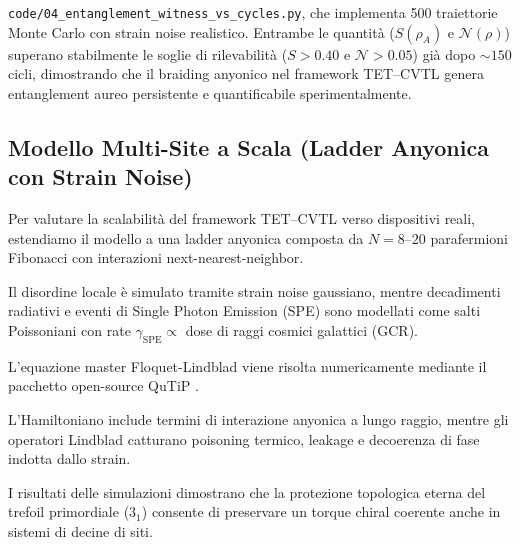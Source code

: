 \documentclass[11pt,a4paper]{article}
\let\oldcite\cite
\renewcommand{\cite}{\protect\oldcite}
\theoremstyle{plain}
\theoremstyle{definition}
\begin{document}
\texttt{code/04\_entanglement\_witness\_vs\_cycles.py}, che implementa 500 traiettorie Monte Carlo con strain noise realistico. 
Entrambe le quantità ($S(\rho_A)$ e $\mathcal{N}(\rho)$) superano stabilmente le soglie di rilevabilità ($S > 0.40$ e $\mathcal{N} > 0.05$) già dopo $\sim150$ cicli, dimostrando che il braiding anyonico nel framework TET--CVTL genera entanglement aureo persistente e quantificabile sperimentalmente. 





\vspace{0.5cm}


\subsection{Modello Multi-Site a Scala (Ladder Anyonica con Strain Noise)}


\vspace{0.2cm}

Per valutare la scalabilità del framework TET--CVTL verso dispositivi reali, estendiamo il modello a una ladder anyonica composta da $N = 8$–$20$ parafermioni Fibonacci con interazioni next-nearest-neighbor. 

\vspace{0.3cm}

Il disordine locale è simulato tramite strain noise gaussiano, mentre decadimenti radiativi e eventi di Single Photon Emission (SPE) sono modellati come salti Poissoniani con rate $\gamma_{\text{SPE}} \propto$ dose di raggi cosmici galattici (GCR).


\vspace{0.3cm}

L'equazione master Floquet-Lindblad viene risolta numericamente mediante il pacchetto open-source QuTiP \cite{Johansson2012}. 


\vspace{0.3cm}

L'Hamiltoniano include termini di interazione anyonica a lungo raggio, mentre gli operatori Lindblad catturano poisoning termico, leakage e decoerenza di fase indotta dallo strain. 

\vspace{0.3cm}

I risultati delle simulazioni dimostrano che la protezione topologica eterna del trefoil primordiale ($3_1$) consente di preservare un torque chiral coerente anche in sistemi di decine di siti. 

\vspace{0.3cm}
\end{document}
